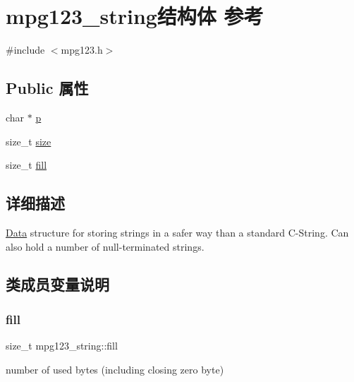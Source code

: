 \hypertarget{structmpg123__string}{}\section{mpg123\+\_\+string结构体 参考}
\label{structmpg123__string}


{\ttfamily \#include $<$mpg123.\+h$>$}

\subsection*{Public 属性}
\begin{DoxyCompactItemize}
\item 
char $\ast$ \hyperlink{structmpg123__string_a25dc48dd64c1df5e56bc2260b74dc5d2}{p}
\item 
size\+\_\+t \hyperlink{structmpg123__string_afa783be283e7e2f287f0b8a129701eba}{size}
\item 
size\+\_\+t \hyperlink{structmpg123__string_ab6a0704da4410a7e913fae5731284915}{fill}
\end{DoxyCompactItemize}


\subsection{详细描述}
\hyperlink{struct_data}{Data} structure for storing strings in a safer way than a standard C-\/\+String. Can also hold a number of null-\/terminated strings. 

\subsection{类成员变量说明}
\mbox{\label{structmpg123__string_ab6a0704da4410a7e913fae5731284915}} 
\subsubsection{\texorpdfstring{fill}{fill}}
{\footnotesize\ttfamily size\+\_\+t mpg123\+\_\+string\+::fill}

number of used bytes (including closing zero byte) \mbox{\label{structmpg123__string_a25dc48dd64c1df5e56bc2260b74dc5d2}} 
